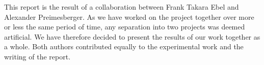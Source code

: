 \begin{declaration}
	
	This report is the result of a collaboration between Frank Takara Ebel and Alexander Preimesberger. As we have worked on the project together over more or less the same period of time, any separation into two projects was deemed artificial. We have therefore decided to present the results of our work together as a whole. Both authors contributed equally to the experimental work and the writing of the report.
	
\end{declaration}